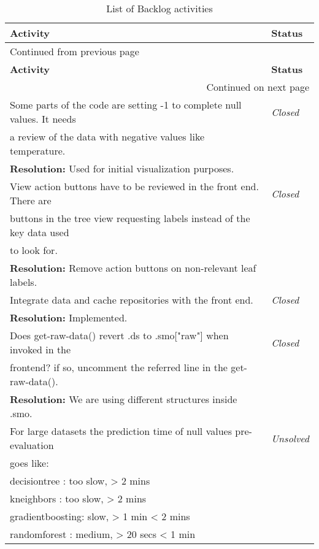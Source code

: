 \documentclass[a4paper]{article}
\begin{document}
\begin{longtable}{ll}
\caption{List of Backlog activities}
\\[0pt]
\hline
\textbf{Activity} & \textbf{Status}\\[0pt]
\hline
\endfirsthead
\multicolumn{2}{l}{Continued from previous page} \\[0pt]
\hline

\textbf{Activity} & \textbf{Status} \\[0pt]

\hline
\endhead
\hline\multicolumn{2}{r}{Continued on next page} \\
\endfoot
\endlastfoot
\hline
Some parts of the code are setting -1 to complete null values. It needs & \emph{Closed}\\[0pt]
a review of the data with negative values like temperature. & \\[0pt]
\textbf{Resolution:} Used for initial visualization purposes. & \\[0pt]
\hline
View action buttons have to be reviewed in the front end. There are & \emph{Closed}\\[0pt]
buttons in the tree view requesting labels instead of the key data used & \\[0pt]
to look for. & \\[0pt]
\textbf{Resolution:} Remove action buttons on non-relevant leaf labels. & \\[0pt]
\hline
Integrate data and cache repositories with the front end. & \emph{Closed}\\[0pt]
\textbf{Resolution:} Implemented. & \\[0pt]
\hline
Does get-raw-data() revert .ds to .smo["raw"] when invoked in the & \emph{Closed}\\[0pt]
frontend? if so, uncomment the referred line in the get-raw-data(). & \\[0pt]
\textbf{Resolution:} We are using different structures inside .smo. & \\[0pt]
\hline
For large datasets the prediction time of null values pre-evaluation & \emph{Unsolved}\\[0pt]
goes like: & \\[0pt]
decisiontree    : too slow,  >   2 mins & \\[0pt]
kneighbors      : too slow,  >   2 mins & \\[0pt]
gradientboosting: slow,      >   1 min  < 2 mins & \\[0pt]
randomforest    : medium,    >  20 secs < 1 min & \\[0pt]

\end{longtable}
\end{document}
